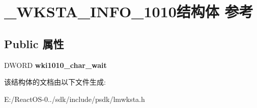 \hypertarget{struct___w_k_s_t_a___i_n_f_o__1010}{}\section{\+\_\+\+W\+K\+S\+T\+A\+\_\+\+I\+N\+F\+O\+\_\+1010结构体 参考}
\label{struct___w_k_s_t_a___i_n_f_o__1010}
\subsection*{Public 属性}
\begin{DoxyCompactItemize}
\item 
\mbox{\label{struct___w_k_s_t_a___i_n_f_o__1010_afdffbd094ca9c9efeb3938f3efc2137a}} 
D\+W\+O\+RD {\bfseries wki1010\+\_\+char\+\_\+wait}
\end{DoxyCompactItemize}


该结构体的文档由以下文件生成\+:\begin{DoxyCompactItemize}
\item 
E\+:/\+React\+O\+S-\/0../sdk/include/psdk/lmwksta.\+h\end{DoxyCompactItemize}

